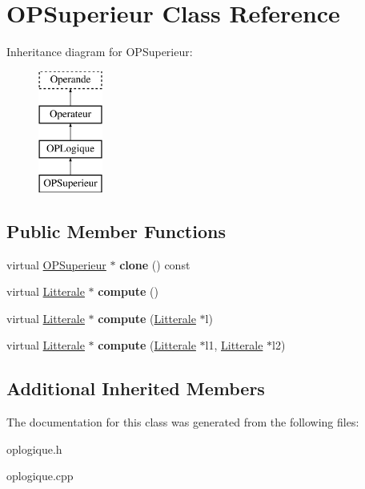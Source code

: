 \hypertarget{class_o_p_superieur}{}\section{O\+P\+Superieur Class Reference}
\label{class_o_p_superieur}
Inheritance diagram for O\+P\+Superieur\+:\begin{figure}[H]
\begin{center}
\leavevmode
\includegraphics[height=4.000000cm]{class_o_p_superieur}
\end{center}
\end{figure}
\subsection*{Public Member Functions}
\begin{DoxyCompactItemize}
\item 
virtual \hyperlink{class_o_p_superieur}{O\+P\+Superieur} $\ast$ {\bfseries clone} () const \hypertarget{class_o_p_superieur_ab923304921d13d5840e7c22ef5527c0a}{}\label{class_o_p_superieur_ab923304921d13d5840e7c22ef5527c0a}

\item 
virtual \hyperlink{class_litterale}{Litterale} $\ast$ {\bfseries compute} ()\hypertarget{class_o_p_superieur_a611ce07b54744c2d1ca6b6f9d56de628}{}\label{class_o_p_superieur_a611ce07b54744c2d1ca6b6f9d56de628}

\item 
virtual \hyperlink{class_litterale}{Litterale} $\ast$ {\bfseries compute} (\hyperlink{class_litterale}{Litterale} $\ast$l)\hypertarget{class_o_p_superieur_aee73e7270974181b5d5ec2ec4cd16491}{}\label{class_o_p_superieur_aee73e7270974181b5d5ec2ec4cd16491}

\item 
virtual \hyperlink{class_litterale}{Litterale} $\ast$ {\bfseries compute} (\hyperlink{class_litterale}{Litterale} $\ast$l1, \hyperlink{class_litterale}{Litterale} $\ast$l2)\hypertarget{class_o_p_superieur_a2bd7a4323e745139cf60bf0c5faf2437}{}\label{class_o_p_superieur_a2bd7a4323e745139cf60bf0c5faf2437}

\end{DoxyCompactItemize}
\subsection*{Additional Inherited Members}


The documentation for this class was generated from the following files\+:\begin{DoxyCompactItemize}
\item 
oplogique.\+h\item 
oplogique.\+cpp\end{DoxyCompactItemize}
